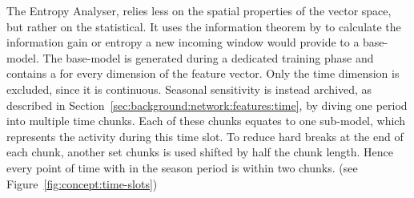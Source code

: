 The Entropy Analyser, relies less on the spatial properties of the vector space, but rather on the statistical.
It uses the information theorem by \textcite{Shannon1948} to calculate the information gain or entropy a new incoming window would provide to a base-model.
The base-model is generated during a dedicated training phase and contains a  for every dimension of the feature vector. Only the time dimension is excluded, since it is continuous.
Seasonal sensitivity is instead archived, as described in Section~\ref{sec:background:network:features:time}, by diving one period into multiple time chunks. Each of these chunks equates to one sub-model, which represents the activity during this time slot. To reduce hard breaks at the end of each chunk, another set chunks is used shifted by half the chunk length. Hence every point of time with in the season period is within two chunks. (see Figure~\ref{fig:concept:time-slots})

